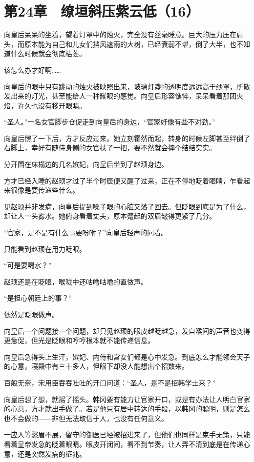 \section{第24章　缭垣斜压紫云低（16）}

向皇后呆呆的坐着，望着灯罩中的烛火，完全没有丝毫睡意。巨大的压力压在肩头，而原本能为自己和儿女们挡风遮雨的大树，已经衰弱不堪，倒了大半，也不知道什么时候就会彻底枯萎。

该怎么办才好啊……

向皇后的眼中只有跳动的烛火被映照出来，玻璃灯盏的透明度远远高于纱罩，所散发出来的灯光，甚至能给人一种耀眼的感觉。向皇后形容憔悴，呆呆看着那团火焰，许久也没有移开眼睛。

“圣人。”一名女官脚步仓促走到向皇后的身边，“官家好像有些不对劲。”

向皇后愣了一下后，方才反应过来。她立刻霍然而起，转身的时候左脚甚至绊倒了右脚上，幸好有随侍身侧的女官扶了一把，要不然就会摔个结结实实。

分开围在床榻边的几名嫔妃，向皇后坐到了赵顼身边。

方才已经入睡的赵顼才过了半个时辰便又醒了过来，正在不停地眨着眼睛，乍看起来很像是要传递些什么。

见赵顼并非发病，向皇后提到嗓子眼的心脏又落了回去。但眨眼到底是为了什么，却让人一头雾水。她俯身看着丈夫，原本蹙起的双眉皱得更紧了几分。

“官家，是不是有什么事要吩咐？”向皇后轻声的问着。

只能看到赵顼在用力眨眼。

“可是要喝水？”

赵顼还是在眨眼，喉咙中还咕噜咕噜的直做声。

“是担心朝廷上的事？”

依然是眨眼做声。

向皇后一个问题接一个问题，却只见赵顼的眼皮越眨越急，发自喉间的声音也变得更急促，但光是眨眼和哼哼根本就不能传递信息。

向皇后急得头上生汗，嫔妃、内侍和宫女们都是心中发急。到底怎么才能领会天子的心意，寝殿中有三十多人，但眼下却没人能想出个招数来。

百般无奈，宋用臣吞吞吐吐的开口问道：“圣人，是不是招韩学士来？”

向皇后想了想，就摇了摇头。韩冈要有能力让官家开口，或是有办法让人明白官家的心意，方才就出手做了。若是他只有居中转达的手段，以韩冈的聪明，则是怎么也不会做的——非但无法取信于人，也没有任何意义。

一应人等愁眉不展，留守的御医已经被招进来了，但他们也同样是束手无策，只能看着皇帝发急的眨着眼睛。眼皮开闭间，看不到节奏，让人弄不清到底是在传递心意，还是突然发病的征兆。

